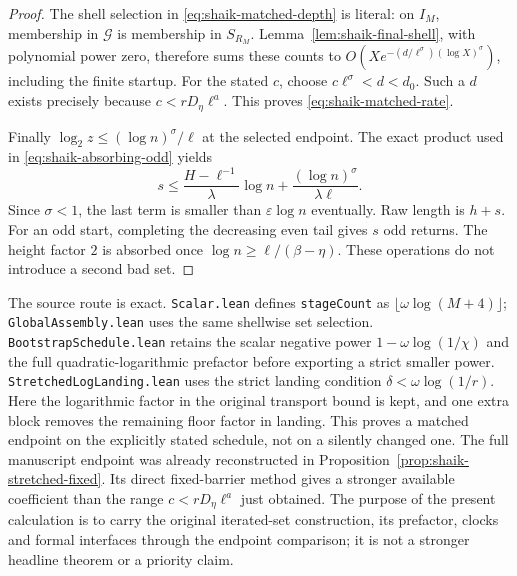 \documentclass[11pt]{article}
\theoremstyle{remark}\newtheorem{remark}[proposition]{Remark}
\begin{document}
\begin{proof}
The shell selection in \eqref{eq:shaik-matched-depth} is literal:
on \(I_M\), membership in \(\mathcal G\) is membership in \(S_{R_M}\).
Lemma~\ref{lem:shaik-final-shell}, with polynomial power zero, therefore
sums these counts to
\(O(Xe^{-(d/\ell^\sigma)(\log X)^\sigma})\), including the finite
startup. For the stated \(c\), choose
\(c\ell^\sigma<d<d_0\). Such a \(d\) exists precisely because
\(c<rD_\eta\ell^a\). This proves \eqref{eq:shaik-matched-rate}.

Finally \(\log_2z\le(\log n)^\sigma/\ell\) at the selected endpoint.
The exact product used in \eqref{eq:shaik-absorbing-odd} yields
\[
 s\le\frac{H-\ell^{-1}}{\lambda}\log n
       +\frac{(\log n)^\sigma}{\lambda\ell}.
\]
Since \(\sigma<1\), the last term is smaller than
\(\varepsilon\log n\) eventually. Raw length is \(h+s\).
For an odd start, completing the decreasing even tail gives \(s\)
odd returns. The height factor \(2\) is absorbed once
\(\log n\ge\ell/(\beta-\eta)\).
These operations do not introduce a second bad set.
\end{proof}

The source route is exact. \texttt{Scalar.lean} defines
\texttt{stageCount} as \(\lfloor\omega\log(M+4)\rfloor\);
\texttt{GlobalAssembly.lean} uses the same shellwise set selection.
\texttt{BootstrapSchedule.lean} retains the scalar negative power
\(1-\omega\log(1/\chi)\) and the full quadratic-logarithmic prefactor
before exporting a strict smaller power.
\texttt{StretchedLogLanding.lean} uses the strict landing condition
\(\delta<\omega\log(1/r)\).
Here the logarithmic factor in the original transport bound is kept,
and one extra block removes the remaining floor factor in landing.
This proves a matched endpoint on the explicitly stated schedule,
not on a silently changed one.
The full manuscript endpoint was already reconstructed in
Proposition~\ref{prop:shaik-stretched-fixed}. Its direct fixed-barrier
method gives a stronger available coefficient than the range
\(c<rD_\eta\ell^a\) just obtained. The purpose of the present calculation
is to carry the original iterated-set construction, its prefactor,
clocks and formal interfaces through the endpoint comparison;
it is not a stronger headline theorem or a priority claim.
\end{document}
